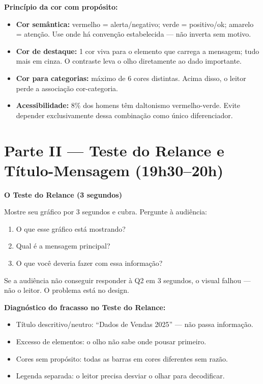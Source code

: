 \begin{SolvedBox}
\textbf{Princípio da cor com propósito:}

\begin{itemize}
  \item \textbf{Cor semântica:} vermelho = alerta/negativo; verde = positivo/ok;
  amarelo = atenção. Use onde há convenção estabelecida — não inverta sem motivo.
  \item \textbf{Cor de destaque:} 1 cor viva para o elemento que carrega a mensagem;
  tudo mais em cinza. O contraste leva o olho diretamente ao dado importante.
  \item \textbf{Cor para categorias:} máximo de 6 cores distintas. Acima disso, o leitor
  perde a associação cor-categoria.
  \item \textbf{Acessibilidade:} 8\% dos homens têm daltonismo vermelho-verde.
  Evite depender exclusivamente dessa combinação como único diferenciador.
\end{itemize}
\end{SolvedBox}

\section{Parte II — Teste do Relance e Título-Mensagem (19h30–20h)}

\begin{BoardBox}
\textbf{O Teste do Relance (3 segundos)}

Mostre seu gráfico por 3 segundos e cubra. Pergunte à audiência:
\begin{enumerate}
  \item O que esse gráfico está mostrando?
  \item Qual é a mensagem principal?
  \item O que você deveria fazer com essa informação?
\end{enumerate}

Se a audiência não conseguir responder à Q2 em 3 segundos, o visual falhou —
não o leitor. O problema está no design.

\textbf{Diagnóstico do fracasso no Teste do Relance:}
\begin{itemize}
  \item Título descritivo/neutro: ``Dados de Vendas 2025'' — não passa informação.
  \item Excesso de elementos: o olho não sabe onde pousar primeiro.
  \item Cores sem propósito: todas as barras em cores diferentes sem razão.
  \item Legenda separada: o leitor precisa desviar o olhar para decodificar.
\end{itemize}
\end{BoardBox}

